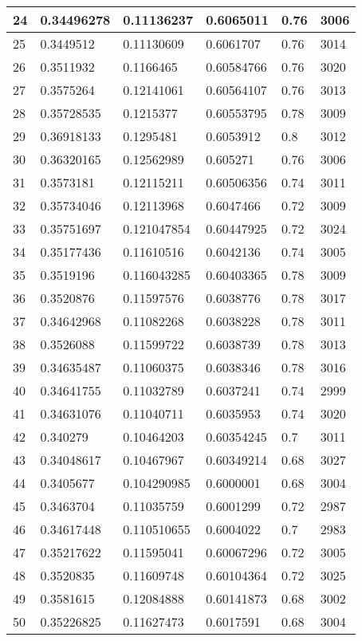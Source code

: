 \begin{longtable}{|l|l|l|l|l|l|}
24 & 0.34496278 & 0.11136237 & 0.6065011 & 0.76 & 3006 \\ \hline 
25 & 0.3449512 & 0.11130609 & 0.6061707 & 0.76 & 3014 \\ \hline 
26 & 0.3511932 & 0.1166465 & 0.60584766 & 0.76 & 3020 \\ \hline 
27 & 0.3575264 & 0.12141061 & 0.60564107 & 0.76 & 3013 \\ \hline 
28 & 0.35728535 & 0.1215377 & 0.60553795 & 0.78 & 3009 \\ \hline 
29 & 0.36918133 & 0.1295481 & 0.6053912 & 0.8 & 3012 \\ \hline 
30 & 0.36320165 & 0.12562989 & 0.605271 & 0.76 & 3006 \\ \hline 
31 & 0.3573181 & 0.12115211 & 0.60506356 & 0.74 & 3011 \\ \hline 
32 & 0.35734046 & 0.12113968 & 0.6047466 & 0.72 & 3009 \\ \hline 
33 & 0.35751697 & 0.121047854 & 0.60447925 & 0.72 & 3024 \\ \hline 
34 & 0.35177436 & 0.11610516 & 0.6042136 & 0.74 & 3005 \\ \hline 
35 & 0.3519196 & 0.116043285 & 0.60403365 & 0.78 & 3009 \\ \hline 
36 & 0.3520876 & 0.11597576 & 0.6038776 & 0.78 & 3017 \\ \hline 
37 & 0.34642968 & 0.11082268 & 0.6038228 & 0.78 & 3011 \\ \hline 
38 & 0.3526088 & 0.11599722 & 0.6038739 & 0.78 & 3013 \\ \hline 
39 & 0.34635487 & 0.11060375 & 0.6038346 & 0.78 & 3016 \\ \hline 
40 & 0.34641755 & 0.11032789 & 0.6037241 & 0.74 & 2999 \\ \hline 
41 & 0.34631076 & 0.11040711 & 0.6035953 & 0.74 & 3020 \\ \hline 
42 & 0.340279 & 0.10464203 & 0.60354245 & 0.7 & 3011 \\ \hline 
43 & 0.34048617 & 0.10467967 & 0.60349214 & 0.68 & 3027 \\ \hline 
44 & 0.3405677 & 0.104290985 & 0.6000001 & 0.68 & 3004 \\ \hline 
45 & 0.3463704 & 0.11035759 & 0.6001299 & 0.72 & 2987 \\ \hline 
46 & 0.34617448 & 0.110510655 & 0.6004022 & 0.7 & 2983 \\ \hline 
47 & 0.35217622 & 0.11595041 & 0.60067296 & 0.72 & 3005 \\ \hline 
48 & 0.3520835 & 0.11609748 & 0.60104364 & 0.72 & 3025 \\ \hline 
49 & 0.3581615 & 0.12084888 & 0.60141873 & 0.68 & 3002 \\ \hline 
50 & 0.35226825 & 0.11627473 & 0.6017591 & 0.68 & 3004 \\ \hline 
\end{longtable}